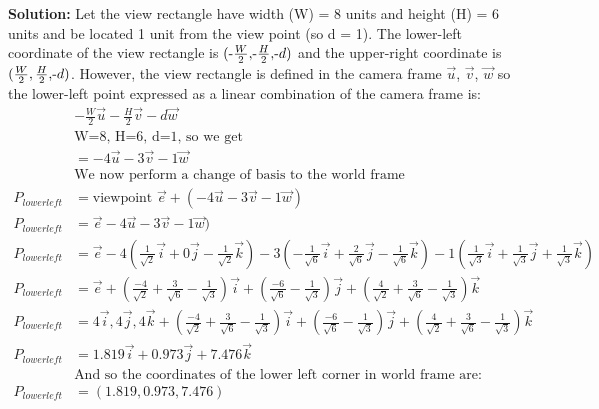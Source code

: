 \documentclass[a4paper, 12pt]{article}
\begin{document}
\begin{enumerate}
        \textbf{Solution:} Let the view rectangle have width (W) = 8 units and height (H) = 6 units and be located 1 unit from the view point (so d = 1). The lower-left coordinate of the view rectangle is \( ( $-$\frac{W}{2}, $-$\frac{H}{2}, $-$d) \) and the upper-right coordinate is \( (\frac{W}{2}, \frac{H}{2}, $-$d) \). However, the view rectangle is defined in the camera frame $\vec{u}$, $\vec{v}$, $\vec{w}$ so the lower-left point expressed as a linear combination of the camera frame is:
        \begin{align*}
            &-\frac{W}{2}\vec{u} - \frac{H}{2}\vec{v} -d\vec{w}\\
            &\text{W=8, H=6, d=1, so we get}\\
            &= -4\vec{u} - 3\vec{v} -1\vec{w}\\
            &\text{We now perform a change of basis to the world frame}\\
            P_{lower left} &= \text{viewpoint $\vec{e}$} + (-4\vec{u} - 3\vec{v} -1\vec{w})\\
            P_{lower left} &= \vec{e} -4\vec{u} - 3\vec{v} -1\vec{w})\\
            P_{lower left} &= \vec{e} -4\left(\frac{1}{\sqrt{2}}\vec{i} + 0\vec{j} -\frac{1}{\sqrt{2}}\vec{k}\right) - 3\left( -\frac{1}{\sqrt{6}}\vec{i} + \frac{2}{\sqrt{6}}\vec{j} -\frac{1}{\sqrt{6}}\vec{k} \right) - 1\left(\frac{1}{\sqrt{3}}\vec{i} + \frac{1}{\sqrt{3}}\vec{j} + \frac{1}{\sqrt{3}}\vec{k}\right)\\
            P_{lower left} &= \vec{e} + \left( \frac{-4}{\sqrt{2}} + \frac{3}{\sqrt{6}} -\frac{1}{\sqrt{3}} \right) \vec{i} + \left(\frac{-6}{\sqrt{6}} - \frac{1}{\sqrt{3}} \right) \vec{j} + \left( \frac{4}{\sqrt{2}} +\frac{3}{\sqrt{6}} - \frac{1}{\sqrt{3}} \right) \vec{k}\\
            P_{lower left} &= 4\vec{i}, 4\vec{j}, 4\vec{k} + \left( \frac{-4}{\sqrt{2}} + \frac{3}{\sqrt{6}} -\frac{1}{\sqrt{3}} \right) \vec{i} + \left(\frac{-6}{\sqrt{6}} - \frac{1}{\sqrt{3}} \right) \vec{j} + \left( \frac{4}{\sqrt{2}} +\frac{3}{\sqrt{6}} - \frac{1}{\sqrt{3}} \right) \vec{k}\\
            P_{lower left} &= 1.819\vec{i} + 0.973\vec{j} + 7.476\vec{k}\\
            &\text{And so the coordinates of the lower left corner in world frame are:}\\
            P_{lower left} &= (1.819, 0.973, 7.476)\\
        \end{align*}

\end{enumerate}
\end{document}
